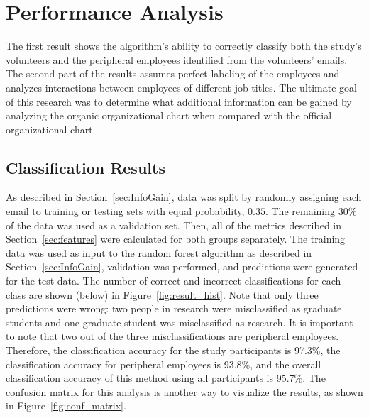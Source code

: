 \documentclass[12pt]{report}
\begin{document}
\chapter{Performance Analysis} \label{Performance}
The first result shows the algorithm's ability to correctly classify both the study's volunteers and the peripheral employees identified from the volunteers' emails.
The second part of the results assumes perfect labeling of the employees and analyzes interactions between employees of different job titles.
The ultimate goal of this research was to determine what additional information can be gained by analyzing the organic organizational chart when compared with the official organizational chart.

\section{Classification Results} \label{ssec:classification_results}
As described in Section~\ref{sec:InfoGain}, data was split by randomly assigning each email to training or testing sets with equal probability, $0.35$.
The remaining 30\% of the data was used as a validation set.
Then, all of the metrics described in Section~\ref{sec:features} were calculated for both groups separately.
The training data was used as input to the random forest algorithm as described in Section~\ref{sec:InfoGain}, validation was performed, and predictions were generated for the test data.
The number of correct and incorrect classifications for each class are shown (below) in Figure~\ref{fig:result_hist}.
Note that only three predictions were wrong: two people in research were misclassified as graduate students and one graduate student was misclassified as research.
It is important to note that two out of the three misclassifications are peripheral employees.
Therefore, the classification accuracy for the study participants is 97.3\%, the classification accuracy for peripheral employees is 93.8\%, and the overall classification accuracy of this method using all participants is 95.7\%.
The confusion matrix for this analysis is another way to visualize the results, as shown in Figure~\ref{fig:conf_matrix}.
\end{document}
